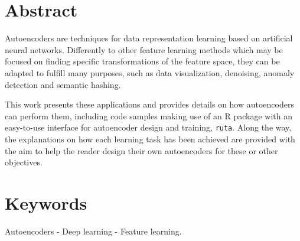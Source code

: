 %
%
%
\section*{Abstract}

Autoencoders are techniques for data representation learning based on artificial neural networks. Differently to other feature learning methods which may be focused on finding specific transformations of the feature space, they can be adapted to fulfill many purposes, such as data visualization, denoising, anomaly detection and semantic hashing. 

This work presents these applications and provides details on how autoencoders can perform them, including code samples making use of an R package with an easy-to-use interface for autoencoder design and training, \texttt{ruta}. Along the way, the explanations on how each learning task has been achieved are provided with the aim to help the reader design their own autoencoders for these or other objectives. 

\section*{Keywords}Autoencoders - Deep learning - Feature learning.
%
%
%
